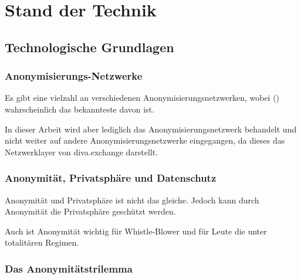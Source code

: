 \chapter{Stand der Technik}\label{ch:StandDerTechnik}





\section{Technologische Grundlagen}

\subsection{Anonymisierungs-Netzwerke}

Es gibt eine vielzahl an verschiedenen Anonymisierungsnetzwerken, wobei  () wahrscheinlich das bekannteste davon ist.

In dieser Arbeit wird aber lediglich das Anonymisierungsnetzwerk  behandelt und nicht weiter auf andere Anonymisierungsnetzwerke eingegangen, da dieses das Netzwerklayer von diva.exchange darstellt.

\subsection{Anonymität, Privatsphäre und Datenschutz}

 Anonymität und Privatsphäre ist nicht das gleiche.
 Jedoch kann durch Anonymität die Privatsphäre geschützt werden.


 Auch ist Anonymität wichtig für Whistle-Blower und für Leute die unter totalitären Regimen.

\subsection{Das Anonymitätstrilemma}\label{sec:anonymitytrilemma}

